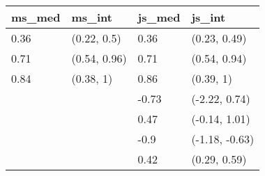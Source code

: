 
\begin{tabular}{llll}
\toprule
ms\_med & ms\_int & js\_med & js\_int\\
\midrule
0.36 & (0.22, 0.5) & 0.36 & (0.23, 0.49)\\
0.71 & (0.54, 0.96) & 0.71 & (0.54, 0.94)\\
0.84 & (0.38, 1) & 0.86 & (0.39, 1)\\
 &  & -0.73 & (-2.22, 0.74)\\
 &  & 0.47 & (-0.14, 1.01)\\
 &  & -0.9 & (-1.18, -0.63)\\
 &  & 0.42 & (0.29, 0.59)\\
\bottomrule
\end{tabular}
